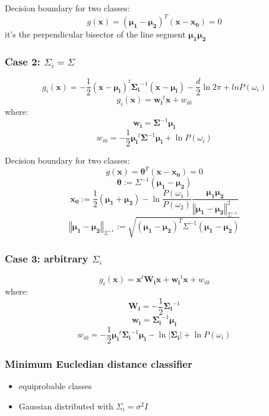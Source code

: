 \documentclass{report}
\begin{document}
Decision boundary for two classes:
\[g(\symbf{x}) = (\symbf{\mu_1} - \symbf{\mu_2})^T (\symbf{x} - \symbf{x_0}) = 0\]
it's the perpendicular bisector of the line segment $\symbf{\mu_1} \symbf{\mu_2}$

\subsubsection*{Case 2: $\Sigma_i = \Sigma$}
\[g_i(\symbf{x}) = -\frac{1}{2} (\symbf{x} - \symbf{\mu_i})^t \symbf{\Sigma_i}^{-1} (\symbf{x} - \symbf{\mu_i}) - \frac{d}{2}\ln2\pi + ln P(\omega_i)\]
\[g_i(\symbf{x}) = \symbf{w_i}^t \symbf{x} + w_{i0}\]
where:
\[\symbf{w_i} = \symbf{\Sigma}^{-1} \symbf{\mu_i}\]
\[w_{i0} = -\frac{1}{2}\symbf{\mu_i}^t \symbf{\Sigma}^{-1} \symbf{\mu_i} + \ln P(\omega_i) \]

Decision boundary for two classes:
\[g(\symbf{x}) = \symbf{\theta}^T (\symbf{x} - \symbf{x_0}) = 0\]
\[\symbf{\theta} := \Sigma^{-1} (\symbf{\mu_1} - \symbf{\mu_2})\]
\[\symbf{x_0} := \frac{1}{2} (\symbf{\mu_1} + \symbf{\mu_2}) - \ln \frac{P(\omega_1)}{P(\omega_2)} \frac{\symbf{\mu_1} \symbf{\mu_2}}{\left\Vert \symbf{\mu_1} - \symbf{\mu_2} \right\Vert_{\Sigma^{-1}}^2}\]
\[\left\Vert \symbf{\mu_1} - \symbf{\mu_2} \right\Vert_{\Sigma^{-1}} := \sqrt{(\symbf{\mu_1} - \symbf{\mu_2})^T \Sigma^{-1} (\symbf{\mu_1} - \symbf{\mu_2})}\]

\subsubsection*{Case 3: arbitrary $\Sigma_i$}
\[g_i(\symbf{x}) = \symbf{x}^t \symbf{W_i} \symbf{x} + \symbf{w_i}^t \symbf{x} + w_{i0}\]
where:
\[\symbf{W_i} = -\frac{1}{2}\symbf{\Sigma_i}^{-1}\]
\[\symbf{w_i} = \symbf{\Sigma_i}^{-1} \symbf{\mu_i}\]
\[w_{i0} = -\frac{1}{2}\symbf{\mu_i}^t \symbf{\Sigma_i}^{-1} \symbf{\mu_i} - \ln |\symbf{\Sigma_i}| + \ln P(\omega_i) \]

\subsubsection*{Minimum Eucledian distance classifier}
\begin{itemize}
	\item equiprobable classes
	\item Gaussian distributed with $\Sigma_i = \sigma^2 I$
\end{itemize}
\end{document}
